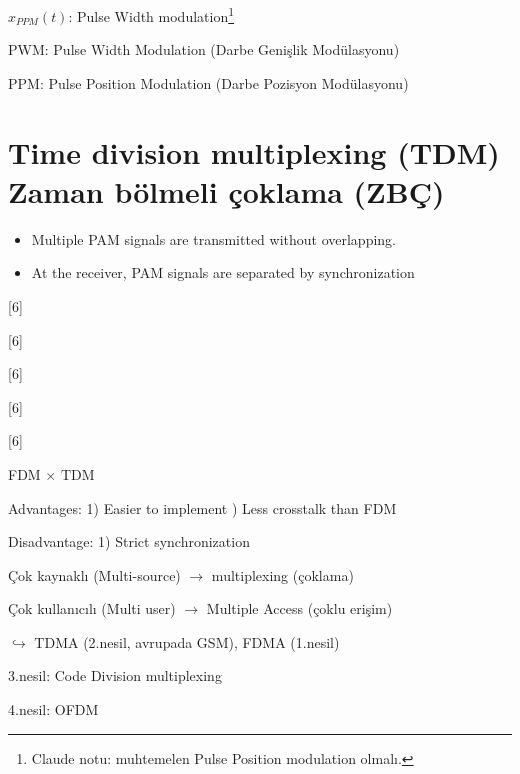 \documentclass[11pt,a4paper]{article}
\begin{document}
$x_{PPM}(t)$: Pulse Width modulation\footnote{Claude notu: muhtemelen Pulse Position modulation olmalı.}


PWM: Pulse Width Modulation (Darbe Genişlik Modülasyonu)

PPM: Pulse Position Modulation (Darbe Pozisyon Modülasyonu)

\section{Time division multiplexing (TDM) \quad Zaman bölmeli çoklama (ZBÇ)}
\begin{itemize}
\item Multiple PAM signals are transmitted without overlapping.
\item At the receiver, PAM signals are separated by synchronization
\end{itemize}

[6]

[6]

[6]

[6]

[6]

FDM $\times$ TDM

Advantages: 1) Easier to implement ) Less crosstalk than FDM

Disadvantage: 1) Strict synchronization

Çok kaynaklı (Multi-source) $\to$ multiplexing (çoklama)

Çok kullanıcılı (Multi user) $\to$ Multiple Access (çoklu erişim)

\hspace*{1em}$\hookrightarrow$ TDMA (2.nesil, avrupada GSM), FDMA (1.nesil)

3.nesil: Code Division multiplexing

4.nesil: OFDM
\end{document}
